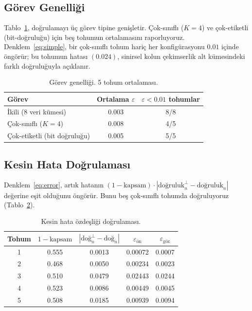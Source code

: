 \documentclass[11pt,a4paper]{article}
\begin{document}
\subsection{Görev Genelliği}
Tablo~\ref{tab:gorevler}, doğrulamayı üç görev tipine genişletir.
Çok-sınıflı ($K=4$) ve çok-etiketli (bit-doğruluğu) için beş tohumun
ortalamasını raporluyoruz. Denklem~\ref{eq:simple}, bir çok-sınıflı
tohum hariç her konfigürasyonu $0.01$ içinde öngörür; bu tohumun
hatası $(0.024)$, sinirsel kolun çekimserlik alt kümesindeki farklı
doğruluğuyla açıklanır.

\begin{table}[ht]
\centering
\caption{Görev genelliği. 5 tohum ortalaması.}
\label{tab:gorevler}
\small
\begin{tabular}{lcc}
\toprule
Görev & Ortalama $\varepsilon$ & $\varepsilon < 0.01$ tohumlar \\
\midrule
İkili (8 veri kümesi) & 0.003 & 8/8 \\
Çok-sınıflı ($K=4$) & 0.008 & 4/5 \\
Çok-etiketli (bit doğruluğu) & 0.005 & 5/5 \\
\bottomrule
\end{tabular}
\end{table}

\subsection{Kesin Hata Doğrulaması}
Denklem~\ref{eq:error}, artık hatanın
$(1-\text{kapsam}) \cdot |\text{doğruluk}_n^{\perp} - \text{doğruluk}_n|$
değerine eşit olduğunu öngörür. Bunu beş çok-sınıflı tohumda
doğruluyoruz (Tablo~\ref{tab:hata}).

\begin{table}[ht]
\centering
\caption{Kesin hata özdeşliği doğrulaması.}
\label{tab:hata}
\small
\begin{tabular}{ccccc}
\toprule
Tohum & $1-\text{kapsam}$ & $|\text{doğ}_n^{\perp} - \text{doğ}_n|$ & $\varepsilon_\text{ön}$ & $\varepsilon_\text{göz}$ \\
\midrule
1 & 0.555 & 0.0013 & 0.00072 & 0.0007 \\
2 & 0.468 & 0.0050 & 0.00234 & 0.0023 \\
3 & 0.510 & 0.0479 & 0.02443 & 0.0244 \\
4 & 0.523 & 0.0086 & 0.00449 & 0.0045 \\
5 & 0.508 & 0.0185 & 0.00939 & 0.0094 \\
\bottomrule
\end{tabular}
\end{table}
\end{document}
